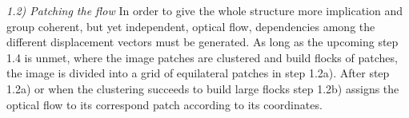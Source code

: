 %
\textit{1.2) Patching the flow}\newline %
In order to give the whole structure more implication and group coherent, but yet independent, optical flow, dependencies among the different displacement vectors must be generated. As long as the upcoming step 1.4 is unmet, where the image patches are clustered and build flocks of patches, the image is divided into a grid of equilateral patches in step 1.2a). After step 1.2a) or when the clustering succeeds to build large flocks step 1.2b) assigns the optical flow to its correspond patch according to its coordinates. 
%
